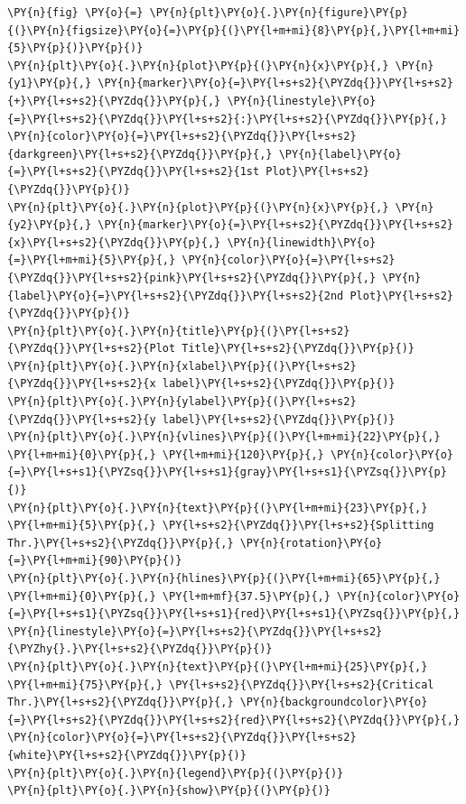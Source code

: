 \begin{tcolorbox}[breakable, size=fbox, boxrule=1pt, pad at break*=1mm,colback=cellbackground, colframe=cellborder]
\begin{Verbatim}[commandchars=\\\{\}]
\PY{n}{fig} \PY{o}{=} \PY{n}{plt}\PY{o}{.}\PY{n}{figure}\PY{p}{(}\PY{n}{figsize}\PY{o}{=}\PY{p}{(}\PY{l+m+mi}{8}\PY{p}{,}\PY{l+m+mi}{5}\PY{p}{)}\PY{p}{)}
\PY{n}{plt}\PY{o}{.}\PY{n}{plot}\PY{p}{(}\PY{n}{x}\PY{p}{,} \PY{n}{y1}\PY{p}{,} \PY{n}{marker}\PY{o}{=}\PY{l+s+s2}{\PYZdq{}}\PY{l+s+s2}{+}\PY{l+s+s2}{\PYZdq{}}\PY{p}{,} \PY{n}{linestyle}\PY{o}{=}\PY{l+s+s2}{\PYZdq{}}\PY{l+s+s2}{:}\PY{l+s+s2}{\PYZdq{}}\PY{p}{,} \PY{n}{color}\PY{o}{=}\PY{l+s+s2}{\PYZdq{}}\PY{l+s+s2}{darkgreen}\PY{l+s+s2}{\PYZdq{}}\PY{p}{,} \PY{n}{label}\PY{o}{=}\PY{l+s+s2}{\PYZdq{}}\PY{l+s+s2}{1st Plot}\PY{l+s+s2}{\PYZdq{}}\PY{p}{)}
\PY{n}{plt}\PY{o}{.}\PY{n}{plot}\PY{p}{(}\PY{n}{x}\PY{p}{,} \PY{n}{y2}\PY{p}{,} \PY{n}{marker}\PY{o}{=}\PY{l+s+s2}{\PYZdq{}}\PY{l+s+s2}{x}\PY{l+s+s2}{\PYZdq{}}\PY{p}{,} \PY{n}{linewidth}\PY{o}{=}\PY{l+m+mi}{5}\PY{p}{,} \PY{n}{color}\PY{o}{=}\PY{l+s+s2}{\PYZdq{}}\PY{l+s+s2}{pink}\PY{l+s+s2}{\PYZdq{}}\PY{p}{,} \PY{n}{label}\PY{o}{=}\PY{l+s+s2}{\PYZdq{}}\PY{l+s+s2}{2nd Plot}\PY{l+s+s2}{\PYZdq{}}\PY{p}{)}
\PY{n}{plt}\PY{o}{.}\PY{n}{title}\PY{p}{(}\PY{l+s+s2}{\PYZdq{}}\PY{l+s+s2}{Plot Title}\PY{l+s+s2}{\PYZdq{}}\PY{p}{)}
\PY{n}{plt}\PY{o}{.}\PY{n}{xlabel}\PY{p}{(}\PY{l+s+s2}{\PYZdq{}}\PY{l+s+s2}{x label}\PY{l+s+s2}{\PYZdq{}}\PY{p}{)}
\PY{n}{plt}\PY{o}{.}\PY{n}{ylabel}\PY{p}{(}\PY{l+s+s2}{\PYZdq{}}\PY{l+s+s2}{y label}\PY{l+s+s2}{\PYZdq{}}\PY{p}{)}
\PY{n}{plt}\PY{o}{.}\PY{n}{vlines}\PY{p}{(}\PY{l+m+mi}{22}\PY{p}{,} \PY{l+m+mi}{0}\PY{p}{,} \PY{l+m+mi}{120}\PY{p}{,} \PY{n}{color}\PY{o}{=}\PY{l+s+s1}{\PYZsq{}}\PY{l+s+s1}{gray}\PY{l+s+s1}{\PYZsq{}}\PY{p}{)}
\PY{n}{plt}\PY{o}{.}\PY{n}{text}\PY{p}{(}\PY{l+m+mi}{23}\PY{p}{,} \PY{l+m+mi}{5}\PY{p}{,} \PY{l+s+s2}{\PYZdq{}}\PY{l+s+s2}{Splitting Thr.}\PY{l+s+s2}{\PYZdq{}}\PY{p}{,} \PY{n}{rotation}\PY{o}{=}\PY{l+m+mi}{90}\PY{p}{)}
\PY{n}{plt}\PY{o}{.}\PY{n}{hlines}\PY{p}{(}\PY{l+m+mi}{65}\PY{p}{,} \PY{l+m+mi}{0}\PY{p}{,} \PY{l+m+mf}{37.5}\PY{p}{,} \PY{n}{color}\PY{o}{=}\PY{l+s+s1}{\PYZsq{}}\PY{l+s+s1}{red}\PY{l+s+s1}{\PYZsq{}}\PY{p}{,} \PY{n}{linestyle}\PY{o}{=}\PY{l+s+s2}{\PYZdq{}}\PY{l+s+s2}{\PYZhy{}.}\PY{l+s+s2}{\PYZdq{}}\PY{p}{)}
\PY{n}{plt}\PY{o}{.}\PY{n}{text}\PY{p}{(}\PY{l+m+mi}{25}\PY{p}{,} \PY{l+m+mi}{75}\PY{p}{,} \PY{l+s+s2}{\PYZdq{}}\PY{l+s+s2}{Critical Thr.}\PY{l+s+s2}{\PYZdq{}}\PY{p}{,} \PY{n}{backgroundcolor}\PY{o}{=}\PY{l+s+s2}{\PYZdq{}}\PY{l+s+s2}{red}\PY{l+s+s2}{\PYZdq{}}\PY{p}{,} \PY{n}{color}\PY{o}{=}\PY{l+s+s2}{\PYZdq{}}\PY{l+s+s2}{white}\PY{l+s+s2}{\PYZdq{}}\PY{p}{)}
\PY{n}{plt}\PY{o}{.}\PY{n}{legend}\PY{p}{(}\PY{p}{)}
\PY{n}{plt}\PY{o}{.}\PY{n}{show}\PY{p}{(}\PY{p}{)}
\end{Verbatim}
\end{tcolorbox}

